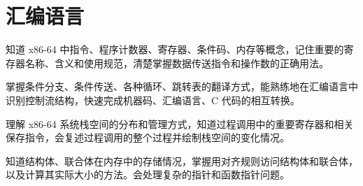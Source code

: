 \chapter{汇编语言}\thispagestyle{empty}
    \begin{summary}
        \begin{compactitem}
            \item 知道 x86-64 中指令、程序计数器、寄存器、条件码、内存等概念，记住重要的寄存器名称、含义和使用规范，清楚掌握数据传送指令和操作数的正确用法。
            \item 掌握条件分支、条件传送、各种循环、跳转表的翻译方式，能熟练地在汇编语言中识别控制流结构，快速完成机器码、汇编语言、C 代码的相互转换。
            \item 理解 x86-64 系统栈空间的分布和管理方式，知道过程调用中的重要寄存器和相关保存指令，会复述过程调用的整个过程并绘制栈空间的变化情况。
            \item 知道结构体、联合体在内存中的存储情况，掌握用对齐规则访问结构体和联合体，以及计算其实际大小的方法。会处理复杂的指针和函数指针问题。
        \end{compactitem}
    \end{summary}

